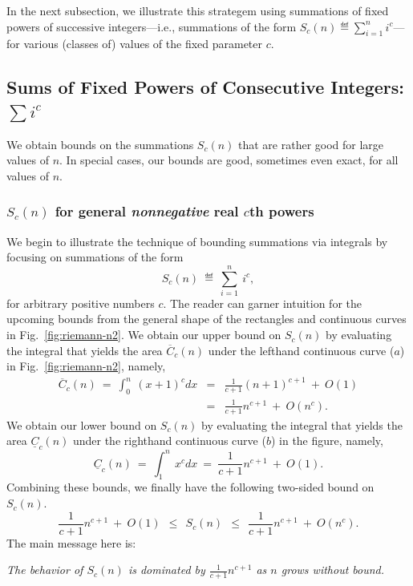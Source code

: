 In the next subsection, we illustrate this strategem using summations
of fixed powers of successive integers---i.e., summations of the form
$\displaystyle S_c(n) \eqdef \sum_{i=1}^n i^c$---for various (classes
of) values of the fixed parameter $c$.


\subsection{Sums of Fixed Powers of Consecutive Integers: $\sum i^c$}
\label{sec:sum-of-i2c}

We obtain bounds on the summations $S_c(n)$ that are rather good for
large values of $n$.  In special cases, our bounds are good, sometimes
even exact, for all values of $n$.

\subsubsection{$S_c(n)$ for general {\em nonnegative} real $c$th powers}
\label{sec:sum-of-i2c>0}

We begin to illustrate the technique of bounding summations via
integrals by focusing on summations of the form
\[ S_c(n) \ \eqdef \ \sum_{i=1}^n \ i^c, \]
for arbitrary positive numbers $c$.  The reader can garner intuition
for the upcoming bounds from the general shape of the rectangles and
continuous curves in Fig.~\ref{fig:riemann-n2}.  We obtain our upper
bound on $S_c(n)$ by evaluating the integral that yields the area
$\overline{C}_c(n)$ under the lefthand continuous curve ($a$) in
Fig.~\ref{fig:riemann-n2}, namely,
\begin{eqnarray}
\label{eq:upper-integral-xc}
\overline{C}_c(n) \ = \
\int_0^n \ (x+1)^c dx & = &
 \frac{1}{c+1} (n+1)^{c+1} \ + \ O(1) \\
\nonumber
 & = & \frac{1}{c+1} n^{c+1} \ + \ O(n^c).
\end{eqnarray}
We obtain our lower bound on $S_c(n)$ by evaluating the integral that
yields the area $\underline{C}_c(n)$ under the righthand continuous
curve ($b$) in the figure, namely,
\begin{equation}
\label{eq:lower-integral-xc}
\underline{C}_c(n) \ = \
\int_1^n \ x^c dx \ = \ \frac{1}{c+1} n^{c+1} \ + \ O(1).
\end{equation}
Combining these bounds, we finally have the following two-sided bound
on $S_c(n)$.
\begin{equation}
\label{eq:bounds-sum-xc}
\frac{1}{c+1} n^{c+1} \ + \ O(1)
  \ \ \leq \ \ S_c(n)
  \ \ \leq \ \ \frac{1}{c+1} n^{c+1} \ + \ O(n^c).
\end{equation}
The main message here is:
\begin{center}
{\em The behavior of $S_c(n)$ is dominated by $\displaystyle
  \frac{1}{c+1} n^{c+1}$ as $n$ grows without bound.  }
\end{center}


